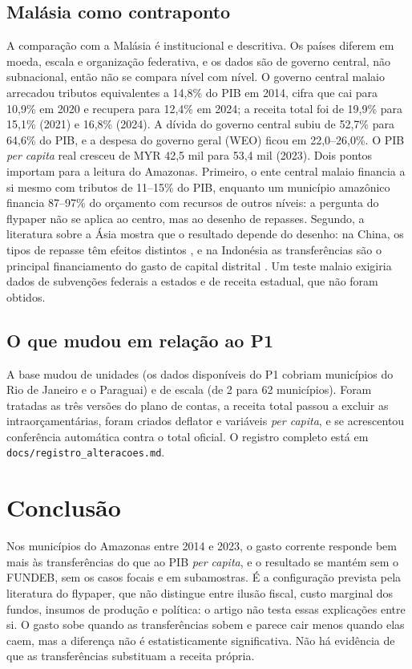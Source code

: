 \documentclass[10pt,twocolumn]{article}
\begin{document}
\subsection{Malásia como contraponto}
A comparação com a Malásia é institucional e descritiva. Os países diferem em moeda, escala e organização federativa, e os dados são de governo central, não subnacional, então não se compara nível com nível. O governo central malaio arrecadou tributos equivalentes a 14,8\% do PIB em 2014, cifra que cai para 10,9\% em 2020 e recupera para 12,4\% em 2024; a receita total foi de 19,9\% para 15,1\% (2021) e 16,8\% (2024). A dívida do governo central subiu de 52,7\% para 64,6\% do PIB, e a despesa do governo geral (WEO) ficou em 22,0--26,0\%. O PIB \textit{per capita} real cresceu de MYR 42,5 mil para 53,4 mil (2023). Dois pontos importam para a leitura do Amazonas. Primeiro, o ente central malaio financia a si mesmo com tributos de 11--15\% do PIB, enquanto um município amazônico financia 87--97\% do orçamento com recursos de outros níveis: a pergunta do flypaper não se aplica ao centro, mas ao desenho de repasses. Segundo, a literatura sobre a Ásia mostra que o resultado depende do desenho: na China, os tipos de repasse têm efeitos distintos \citep{zhang2013,tsui2005}, e na Indonésia as transferências são o principal financiamento do gasto de capital distrital \citep{aritenang2020,lewis2017}. Um teste malaio exigiria dados de subvenções federais a estados e de receita estadual, que não foram obtidos.

\subsection{O que mudou em relação ao P1}
A base mudou de unidades (os dados disponíveis do P1 cobriam municípios do Rio de Janeiro e o Paraguai) e de escala (de 2 para 62 municípios). Foram tratadas as três versões do plano de contas, a receita total passou a excluir as intraorçamentárias, foram criados deflator e variáveis \textit{per capita}, e se acrescentou conferência automática contra o total oficial. O registro completo está em \texttt{docs/registro\_alteracoes.md}.

\section{Conclusão}\label{sec:conc}
Nos municípios do Amazonas entre 2014 e 2023, o gasto corrente responde bem mais às transferências do que ao PIB \textit{per capita}, e o resultado se mantém sem o FUNDEB, sem os casos focais e em subamostras. É a configuração prevista pela literatura do flypaper, que não distingue entre ilusão fiscal, custo marginal dos fundos, insumos de produção e política: o artigo não testa essas explicações entre si. O gasto sobe quando as transferências sobem e parece cair menos quando elas caem, mas a diferença não é estatisticamente significativa. Não há evidência de que as transferências substituam a receita própria.
\end{document}
